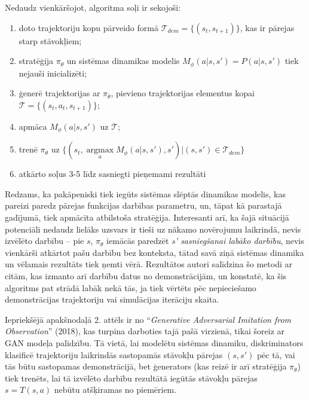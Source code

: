 \documentclass[12pt, a4paper]{article}
\numberwithin{equation}{section} %
\begin{document}
Nedaudz vienkāršojot, algoritma soļi ir sekojoši:

\begin{enumerate}
    \item doto trajektoriju kopu pārveido formā $\mathcal{T}_{dem}=\lbrace (s_t, s_{t+1}) \rbrace$, kas ir pārejas starp stāvokļiem;
    \item stratēģija $\pi_{\theta}$ un sistēmas dinamikas modelis $M_{\phi}(a \vert s,s')=P(a \vert s, s')$ tiek nejauši inicializēti;
    \item ģenerē trajektorijas ar $\pi_{\theta}$, pievieno trajektorijas elementus kopai $\mathcal{T}=\lbrace (s_t, a_t, s_{t+1}) \rbrace$;
    \item apmāca $M_{\phi}(a \vert s, s')$ uz $\mathcal{T}$;
    \item trenē $\pi_{\theta}$ uz $\lbrace (s_t, \operatorname*{argmax}\limits_a M_{\phi}(a \vert s, s'), s')\vert (s, s') \in \mathcal{T}_{dem} \rbrace$
    \item atkārto soļus 3-5 līdz sasniegti pieņemami rezultāti
\end{enumerate}

Redzams, ka pakāpeniski tiek iegūts sistēmas slēptās dinamikas modelis, kas pareizi paredz pārejas funkcijas darbības parametru, un, tāpat kā parastajā gadījumā, tiek apmācīta atbilstoša stratēģija. Interesanti arī, ka šajā situācijā potenciāli nedaudz lielāks uzsvars ir tieši uz nākamo novērojumu laikrindā, nevis izvēlēto darbību -- pie $s$, $\pi_{\theta}$ iemācās paredzēt \textit{s' sasniegšanai labāko darbību}, nevis vienkārši atkārtot pašu darbību bez konteksta, tātad savā ziņā sistēmas dinamika un vēlamais rezultāts tiek ņemti vērā. Rezultātos autori salīdzina šo metodi ar citām, kas izmanto arī darbību datus no demonstrācijām, un konstatē, ka šis algoritms pat strādā labāk nekā tās, ja tiek vērtēts pēc nepieciešamo demonstrācijas trajektoriju vai simulācijas iterāciju skaita.

Iepriekšējā apakšnodaļā 2. attēls ir no ``\textit{Generative Adversarial Imitation from Observation}'' \cite{torabi2018behavioral} (2018), kas turpina darboties tajā pašā virzienā, tikai šoreiz ar GAN modeļa palīdzību. Tā vietā, lai modelētu sistēmas dinamiku, diskriminators klasificē trajektoriju laikrindās sastopamās stāvokļu pārejas $(s, s')$ pēc tā, vai tās būtu sastopamas demonstrācijā, bet ģenerators (kas reizē ir arī stratēģija $\pi_{\theta}$) tiek trenēts, lai tā izvēlēto darbību rezultātā iegūtās stāvokļu pārejas $s=T(s,a)$ nebūtu atšķiramas no piemēriem.
\end{document}
